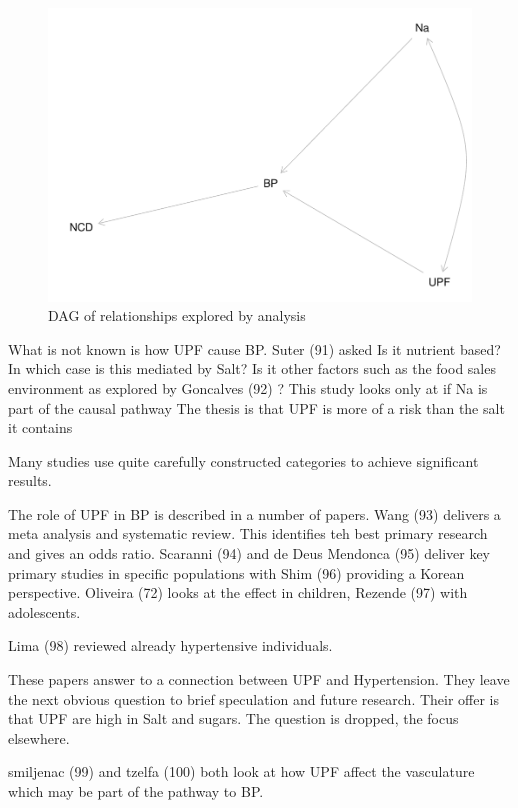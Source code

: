 \documentclass[
]{article}
\begin{document}
\begin{figure}
\centering
\includegraphics{methodandresults_files/figure-latex/fig-dagupfbp-1.pdf}
\caption{DAG of relationships explored by analysis}
\end{figure}

What is not known is how UPF cause BP. Suter (91) asked Is it nutrient
based? In which case is this mediated by Salt? Is it other factors such
as the food sales environment as explored by Goncalves (92) ? This study
looks only at if Na is part of the causal pathway The thesis is that UPF
is more of a risk than the salt it contains

Many studies use quite carefully constructed categories to achieve
significant results.

The role of UPF in BP is described in a number of papers. Wang (93)
delivers a meta analysis and systematic review. This identifies teh best
primary research and gives an odds ratio. Scaranni (94) and de Deus
Mendonca (95) deliver key primary studies in specific populations with
Shim (96) providing a Korean perspective. Oliveira (72) looks at the
effect in children, Rezende (97) with adolescents.

Lima (98) reviewed already hypertensive individuals.

These papers answer to a connection between UPF and Hypertension. They
leave the next obvious question to brief speculation and future
research. Their offer is that UPF are high in Salt and sugars. The
question is dropped, the focus elsewhere.

smiljenac (99) and tzelfa (100) both look at how UPF affect the
vasculature which may be part of the pathway to BP.
\end{document}
